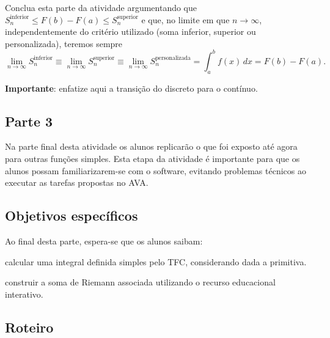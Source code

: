 \documentclass[a4paper,12pt]{scrartcl}
\newcommand\importante{\textbf{Importante}}
\begin{document}
\begin{list}{.}
	\item Conclua esta parte da atividade argumentando que $S_n^{\text{inferior}} \le F(b) - F(a) \le S_n^{\text{superior}}$ e que, no limite em que $n \to \infty$,
	independentemente do critério utilizado (soma inferior, superior ou personalizada), teremos sempre
	\begin{equation*}
	  \lim_{n\to\infty} S_n^{\text{inferior}} \equiv \lim_{n\to\infty} S_n^{\text{superior}} \equiv \lim_{n\to\infty} S_n^{\text{personalizada}} = \int_a^b f(x)\, dx = F(b) - F(a).
	\end{equation*}
	
	\importante: enfatize aqui a transição do discreto para o contínuo.
    
      \end{list}
      
    \subsection*{Parte 3}
    
      Na parte final desta atividade os alunos replicarão o que foi exposto até agora para outras funções simples.
      Esta etapa da atividade é importante para que os alunos possam familiarizarem-se com o software, evitando problemas técnicos ao executar as tarefas propostas no AVA.
    
      \subsection*{Objetivos específicos}
  
      Ao final desta parte, espera-se que os alunos saibam:
      \begin{compactitem}
	\item calcular uma integral definida simples pelo TFC, considerando dada a primitiva.
	\item construir a soma de Riemann associada utilizando o recurso educacional interativo.
      \end{compactitem}
      
      \subsection*{Roteiro}
      
\end{document}
